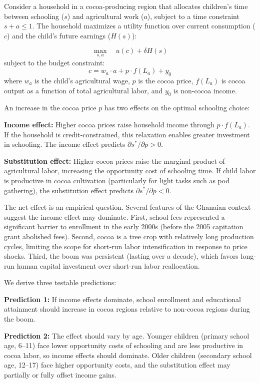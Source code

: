 \documentclass[12pt]{article}
\begin{document}
Consider a household in a cocoa-producing region that allocates children's time between schooling ($s$) and agricultural work ($a$), subject to a time constraint $s + a \leq 1$. The household maximizes a utility function over current consumption ($c$) and the child's future earnings ($H(s)$):

\begin{equation}
\max_{s, a} \quad u(c) + \delta H(s)
\end{equation}
subject to the budget constraint:
\begin{equation}
c = w_a \cdot a + p \cdot f(L_a) + y_0
\end{equation}
where $w_a$ is the child's agricultural wage, $p$ is the cocoa price, $f(L_a)$ is cocoa output as a function of total agricultural labor, and $y_0$ is non-cocoa income.

An increase in the cocoa price $p$ has two effects on the optimal schooling choice:

\textbf{Income effect:} Higher cocoa prices raise household income through $p \cdot f(L_a)$. If the household is credit-constrained, this relaxation enables greater investment in schooling. The income effect predicts $\partial s^* / \partial p > 0$.

\textbf{Substitution effect:} Higher cocoa prices raise the marginal product of agricultural labor, increasing the opportunity cost of schooling time. If child labor is productive in cocoa cultivation (particularly for light tasks such as pod gathering), the substitution effect predicts $\partial s^* / \partial p < 0$.

The net effect is an empirical question. Several features of the Ghanaian context suggest the income effect may dominate. First, school fees represented a significant barrier to enrollment in the early 2000s (before the 2005 capitation grant abolished fees). Second, cocoa is a tree crop with relatively long production cycles, limiting the scope for short-run labor intensification in response to price shocks. Third, the boom was persistent (lasting over a decade), which favors long-run human capital investment over short-run labor reallocation.

We derive three testable predictions:

\textbf{Prediction 1:} If income effects dominate, school enrollment and educational attainment should increase in cocoa regions relative to non-cocoa regions during the boom.

\textbf{Prediction 2:} The effect should vary by age. Younger children (primary school age, 6--11) face lower opportunity costs of schooling and are less productive in cocoa labor, so income effects should dominate. Older children (secondary school age, 12--17) face higher opportunity costs, and the substitution effect may partially or fully offset income gains.
\end{document}
